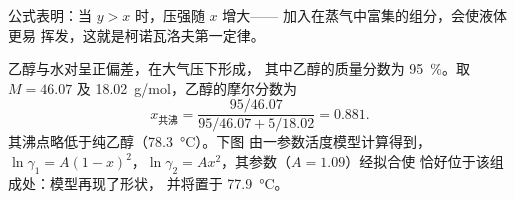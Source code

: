 公式表明：当 $y > x$ 时，压强随 $x$ 增大——
加入在蒸气中富集的组分，会使液体更易
挥发，这就是柯诺瓦洛夫第一定律。

\begin{example}[乙醇与水]\label{ex:b2:liquid-vapour-diagrams:ethanol-water}
乙醇与水对呈正偏差，在大气压下形成，
其中乙醇的质量分数为 95~\%。取 $M = 46.07$ 及
\qty{18.02}{g/mol}，乙醇的摩尔分数为
\[
  x_{\text{共沸}} = \frac{95/46.07}{95/46.07 + 5/18.02} = 0.881 .
\]
其沸点略低于纯乙醇（\qty{78.3}{\degreeCelsius}）。下图
由一参数活度模型计算得到，$\ln\gamma_1 = A(1 -
x)^2$，$\ln\gamma_2 = Ax^2$，其参数（$A = 1.09$）经拟合使
恰好位于该组成处：模型再现了形状，
并将置于 \qty{77.9}{\degreeCelsius}。
\end{example}


